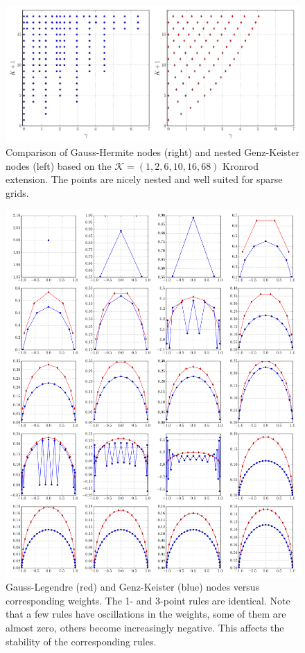 \documentclass[a4paper,10pt]{article}
\begin{document}
\begin{figure}[h]
  \centering
  \includegraphics[width=\linewidth]{./img/gk_hermitephy_nodes_cmp.pdf}
  \caption{Comparison of Gauss-Hermite nodes (right) and nested Genz-Keister nodes (left)
  based on the $\mathcal{K} = (1, 2, 6, 10, 16, 68)$ Kronrod extension. The points are
  nicely nested and well suited for sparse grids.}
  \label{fig:gk_hermitephy_nodes_cmp}
\end{figure}


\begin{figure}
  \centering
  \includegraphics[width=\linewidth]{./img/gk_legendre_nodes_1d.pdf}
  \caption{Gauss-Legendre (red) and Genz-Keister (blue) nodes versus
  corresponding weights. The 1- and 3-point rules are identical.
  Note that a few rules have oscillations in the weights, some of them
  are almost zero, others become increasingly negative. This affects the
  stability of the corresponding rules.}
  \label{fig:gk_legendre_nodes_1d}
\end{figure}
\end{document}
